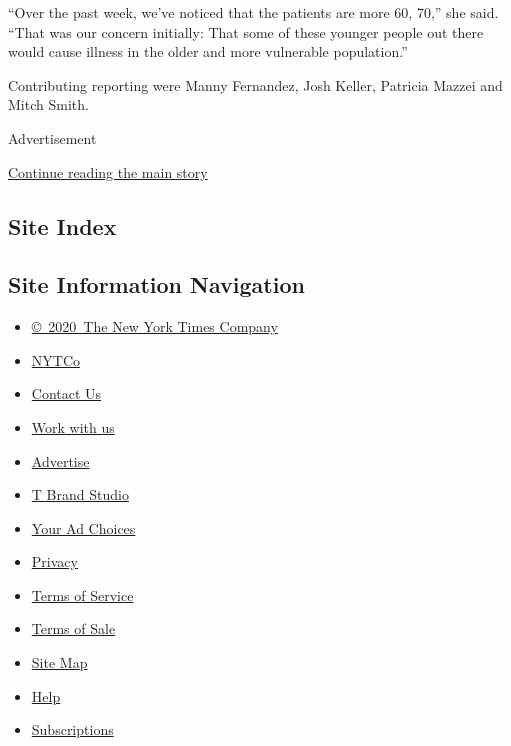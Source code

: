 ``Over the past week, we've noticed that the patients are more 60, 70,''
she said. ``That was our concern initially: That some of these younger
people out there would cause illness in the older and more vulnerable
population.''

Contributing reporting were Manny Fernandez, Josh Keller, Patricia
Mazzei and Mitch Smith.

Advertisement

\protect\hyperlink{after-bottom}{Continue reading the main story}

\hypertarget{site-index}{%
\subsection{Site Index}\label{site-index}}

\hypertarget{site-information-navigation}{%
\subsection{Site Information
Navigation}\label{site-information-navigation}}

\begin{itemize}
\tightlist
\item
  \href{https://help.nytimes3xbfgragh.onion/hc/en-us/articles/115014792127-Copyright-notice}{©~2020~The
  New York Times Company}
\end{itemize}

\begin{itemize}
\tightlist
\item
  \href{https://www.nytco.com/}{NYTCo}
\item
  \href{https://help.nytimes3xbfgragh.onion/hc/en-us/articles/115015385887-Contact-Us}{Contact
  Us}
\item
  \href{https://www.nytco.com/careers/}{Work with us}
\item
  \href{https://nytmediakit.com/}{Advertise}
\item
  \href{http://www.tbrandstudio.com/}{T Brand Studio}
\item
  \href{https://www.nytimes3xbfgragh.onion/privacy/cookie-policy\#how-do-i-manage-trackers}{Your
  Ad Choices}
\item
  \href{https://www.nytimes3xbfgragh.onion/privacy}{Privacy}
\item
  \href{https://help.nytimes3xbfgragh.onion/hc/en-us/articles/115014893428-Terms-of-service}{Terms
  of Service}
\item
  \href{https://help.nytimes3xbfgragh.onion/hc/en-us/articles/115014893968-Terms-of-sale}{Terms
  of Sale}
\item
  \href{https://spiderbites.nytimes3xbfgragh.onion}{Site Map}
\item
  \href{https://help.nytimes3xbfgragh.onion/hc/en-us}{Help}
\item
  \href{https://www.nytimes3xbfgragh.onion/subscription?campaignId=37WXW}{Subscriptions}
\end{itemize}
